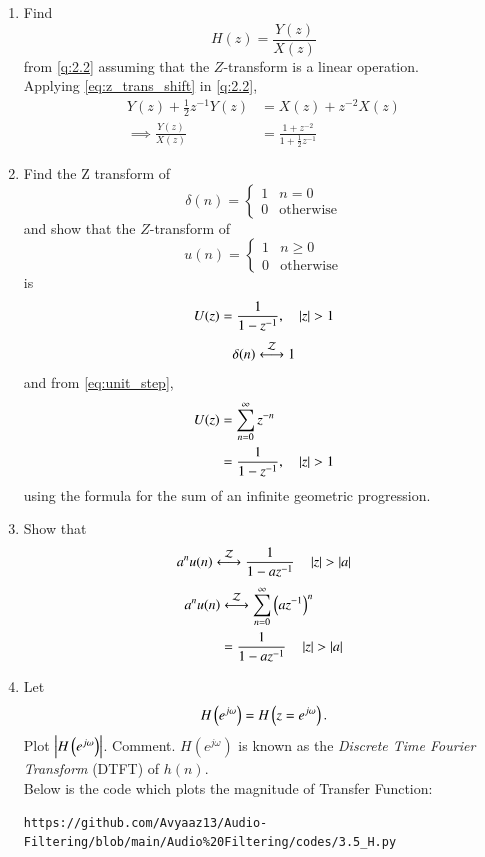 \documentclass[journal,12pt,twocolumn]{IEEEtran}
\theoremstyle{remark}
\renewcommand\thesection{\arabic{section}}
\numberwithin{equation}{subsection}
\begin{document}
\begin{enumerate}[label=\thesection.\arabic*]
\item Find
%
\begin{equation}
H(z) = \frac{Y(z)}{X(z)}
\end{equation}
from  \eqref{q:2.2} assuming that the $Z$-transform is a linear operation.
\\
\solution  Applying \eqref{eq:z_trans_shift} in \eqref{q:2.2},
\begin{align}
Y(z) + \frac{1}{2}z^{-1}Y(z) &= X(z)+z^{-2}X(z)
\\
\implies \frac{Y(z)}{X(z)} &= \frac{1 + z^{-2}}{1 + \frac{1}{2}z^{-1}}
\label{eq:freq_resp}
\end{align}
%
\item Find the Z transform of 
\begin{equation}
\delta(n)
=
\begin{cases}
1 & n = 0
\\
0 & \text{otherwise}
\end{cases}
\end{equation}
and show that the $Z$-transform of
\begin{equation}
\label{eq:unit_step}
u(n)
=
\begin{cases}
1 & n \ge 0
\\
0 & \text{otherwise}
\end{cases}
\end{equation}
is
\begin{equation}
U(z) = \frac{1}{1-z^{-1}}, \quad \left\vert z\right\vert > 1
\end{equation}
\solution
\begin{equation}
\delta(n) \system{Z} 1
\end{equation}
and from \eqref{eq:unit_step},
\begin{align}
U(z) &= \sum _{n= 0}^{\infty}z^{-n}
\\
&=\frac{1}{1-z^{-1}}, \quad \left\vert z\right\vert > 1
\end{align}
using the formula for the sum of an infinite geometric progression.
%
\item Show that 
\begin{equation}
\label{eq:anun}
a^nu(n) \system{Z} \frac{1}{1-az^{-1}} \quad \abs{z} > \abs{a}
\end{equation}
\solution 
\begin{align}
	a^nu(n) &\system{Z} \sum_{n = 0}^{\infty}\brak{az^{-1}}^n \\
			&= \frac{1}{1-az^{-1}} \quad \abs{z} > \abs{a}
\end{align}
%
\item 
Let
\begin{equation}
	H\left(e^{j \omega}\right) = H\left(z = e^{j \omega}\right).
\end{equation}
Plot $\left\vert H\left(e^{j \omega}\right)\right\vert$.  Comment.  $H(e^{j \omega})$ is
known as the {\em Discrete Time Fourier Transform} (DTFT) of $h(n)$.
\\
\solution Below is the code which plots the magnitude of Transfer Function:
\begin{lstlisting}
https://github.com/Avyaaz13/Audio-Filtering/blob/main/Audio%20Filtering/codes/3.5_H.py
\end{lstlisting}



\end{enumerate}
\end{document}
